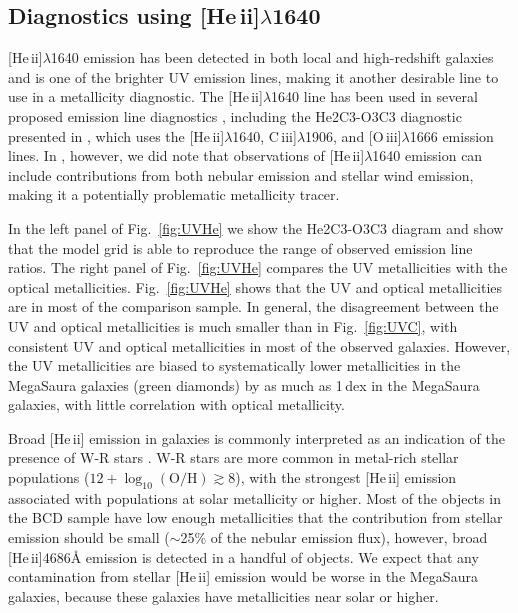 \documentclass[preprint2]{aastex62}
\newcommand{\oiii}{[O\,{\sc iii}]\xspace}
\newcommand{\heii}{[He\,{\sc ii}]\xspace}
\newcommand{\ciii}{C\,{\sc iii}]\xspace}
\newcommand{\logten}{\ensuremath{\log_{10}}}
\newcommand{\logOH}{\ensuremath{\logten (\mathrm{O}/\mathrm{H})}\xspace}
\newcommand{\ang}{\ensuremath{\mbox{\AA}}\xspace}
\newcommand{\mage}{{\sc Meg}a{\sc S}a{\sc ura}\xspace}
\begin{document}
\subsection{Diagnostics using \heii$\lambda$1640}\label{sec:UVOpt:He}

\heii$\lambda$1640 emission has been detected in both local and high-redshift galaxies and is one of the brighter UV emission lines, making it another desirable line to use in a metallicity diagnostic. The \heii$\lambda$1640 line has been used in several proposed emission line diagnostics \citep[e.g.,][]{Jaskot+2016, Feltre+2016}, including the He2C3-O3C3 diagnostic presented in \citet{Byler+2018}, which uses the \heii$\lambda$1640, \ciii$\lambda$1906, and \oiii$\lambda$1666 emission lines. In \citet{Byler+2018}, however, we did note that observations of \heii$\lambda$1640 emission can include contributions from both nebular emission and stellar wind emission, making it a potentially problematic metallicity tracer.

In the left panel of Fig.~\ref{fig:UVHe} we show the He2C3-O3C3 diagram and show that the model grid is able to reproduce the range of observed emission line ratios. The right panel of Fig.~\ref{fig:UVHe} compares the UV metallicities with the optical metallicities. Fig.~\ref{fig:UVHe} shows that the UV and optical metallicities are in most of the comparison sample. In general, the disagreement between the UV and optical metallicities is much smaller than in Fig.~\ref{fig:UVC}, with consistent UV and optical metallicities in most of the observed galaxies. However, the UV metallicities are biased to systematically lower metallicities in the \mage galaxies (green diamonds) by as much as 1\,dex in the \mage galaxies, with little correlation with optical metallicity.

Broad \heii emission in galaxies is commonly interpreted as an indication of the presence of W-R stars \citep[e.g., ][]{Kunth+1985,Conti+1991, Schaerer+1999, Brinchmann+2008}. W-R stars are more common in metal-rich stellar populations ($12+\logOH \gtrsim 8$), with the strongest \heii emission associated with populations at solar metallicity or higher. Most of the objects in the \citet{Berg+2016} BCD sample have low enough metallicities that the contribution from stellar emission should be small (${\sim}$25\% of the nebular emission flux), however, broad \heii$4686\ang$ emission is detected in a handful of objects. We expect that any contamination from stellar \heii emission would be worse in the \mage galaxies, because these galaxies have metallicities near solar or higher.
\end{document}
